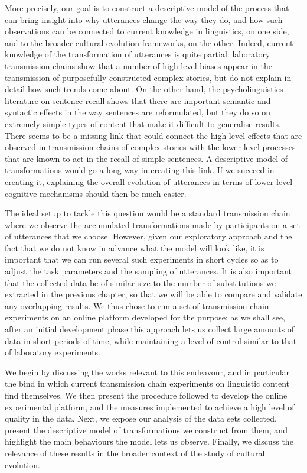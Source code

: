 More precisely, our goal is to construct a descriptive model of the
process that can bring insight into why utterances change the way they
do, and how such observations can be connected to current knowledge in
linguistics, on one side, and to the broader cultural evolution
frameworks, on the other. Indeed, current knowledge of the
transformation of utterances is quite partial: laboratory transmission
chains show that a number of high-level biases appear in the
transmission of purposefully constructed complex stories, but do not
explain in detail how such trends come about. On the other hand, the
psycholinguistics literature on sentence recall shows that there are
important semantic and syntactic effects in the way sentences are
reformulated, but they do so on extremely simple types of content that
make it difficult to generalise results. There seems to be a missing
link that could connect the high-level effects that are observed in
transmission chains of complex stories with the lower-level processes
that are known to act in the recall of simple sentences. A descriptive
model of transformations would go a long way in creating this link. If
we succeed in creating it, explaining the overall evolution of
utterances in terms of lower-level cognitive mechanisms should then be
much easier.

The ideal setup to tackle this question would be a standard transmission
chain where we observe the accumulated transformations made by
participants on a set of utterances that we choose. However, given our
exploratory approach and the fact that we do not know in advance what
the model will look like, it is important that we can run several such
experiments in short cycles so as to adjust the task parameters and the
sampling of utterances. It is also important that the collected data be
of similar size to the number of substitutions we extracted in the
previous chapter, so that we will be able to compare and validate any
overlapping results. We thus chose to run a set of transmission chain
experiments on an online platform developed for the purpose: as we shall
see, after an initial development phase this approach lets us collect
large amounts of data in short periods of time, while maintaining a
level of control similar to that of laboratory experiments.

We begin by discussing the works relevant to this endeavour, and in
particular the bind in which current transmission chain experiments on
linguistic content find themselves. We then present the procedure
followed to develop the online experimental platform, and the measures
implemented to achieve a high level of quality in the data. Next, we
expose our analysis of the data sets collected, present the descriptive
model of transformations we construct from them, and highlight the main
behaviours the model lets us observe. Finally, we discuss the relevance
of these results in the broader context of the study of cultural
evolution.


